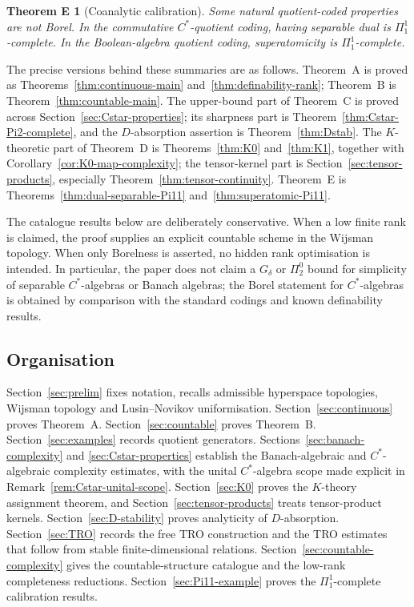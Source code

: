 \documentclass[12pt,fleqn,a4paper]{amsart}
\numberwithin{equation}{section}
\newtheorem*{theoremE}{Theorem E}
\theoremstyle{definition}
\begin{document}
\begin{theoremE}[Coanalytic calibration]
Some natural quotient-coded properties are not Borel.  In the commutative
$C^*$-quotient coding, having separable dual is $\Pi^1_1$-complete.  In the
Boolean-algebra quotient coding, superatomicity is $\Pi^1_1$-complete.
\end{theoremE}

The precise versions behind these summaries are as follows.  Theorem~A is proved as
Theorems~\ref{thm:continuous-main} and~\ref{thm:definability-rank}; Theorem~B is
Theorem~\ref{thm:countable-main}.  The upper-bound part of Theorem~C is proved across
Section~\ref{sec:Cstar-properties}; its sharpness part is Theorem~\ref{thm:Cstar-Pi2-complete},
and the $D$-absorption assertion is Theorem~\ref{thm:Dstab}.  The $K$-theoretic part of
Theorem~D is Theorems~\ref{thm:K0} and~\ref{thm:K1}, together with
Corollary~\ref{cor:K0-map-complexity}; the tensor-kernel part is Section~\ref{sec:tensor-products},
especially Theorem~\ref{thm:tensor-continuity}.  Theorem~E is
Theorems~\ref{thm:dual-separable-Pi11} and~\ref{thm:superatomic-Pi11}.

The catalogue results below are deliberately conservative.  When a low finite rank is
claimed, the proof supplies an explicit countable scheme in the Wijsman topology.  When
only Borelness is asserted, no hidden rank optimisation is intended.  In particular, the
paper does not claim a $G_\delta$ or $\Pi^0_2$ bound for simplicity of separable
$C^*$-algebras or Banach algebras; the Borel statement for $C^*$-algebras is obtained by
comparison with the standard codings and known definability results.

\subsection{Organisation}

Section~\ref{sec:prelim} fixes notation, recalls admissible hyperspace topologies,
Wijsman topology and Lusin--Novikov uniformisation.  Section~\ref{sec:continuous}
proves Theorem~A.  Section~\ref{sec:countable} proves Theorem~B.  Section~\ref{sec:examples}
records quotient generators.  Sections~\ref{sec:banach-complexity} and
\ref{sec:Cstar-properties} establish the Banach-algebraic and $C^*$-algebraic
complexity estimates, with the unital $C^*$-algebra scope made explicit in
Remark~\ref{rem:Cstar-unital-scope}.  Section~\ref{sec:K0} proves the
$K$-theory assignment theorem, and Section~\ref{sec:tensor-products} treats
tensor-product kernels.  Section~\ref{sec:D-stability} proves analyticity of
$D$-absorption.  Section~\ref{sec:TRO} records the free TRO construction and the
TRO estimates that follow from stable finite-dimensional relations.  Section~\ref{sec:countable-complexity}
gives the countable-structure catalogue and the low-rank completeness reductions.
Section~\ref{sec:Pi11-example} proves the $\Pi^1_1$-complete calibration results.
\end{document}
